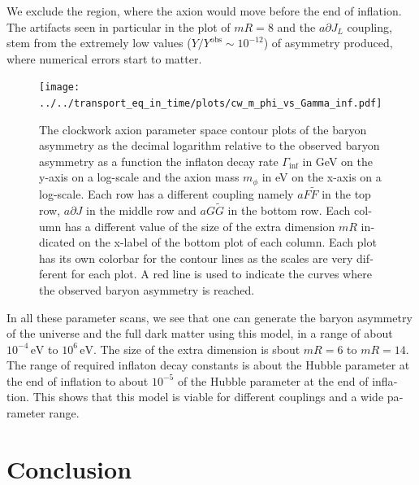 \documentclass[master,       %
               twoside,        %
               BCOR10mm,       %
               english,ngerman, %
               ]{GAUBM}
\begin{document}
\begin{otherlanguage}{english}
We exclude the region, where the axion would move before the end of inflation.
The artifacts seen in particular in the plot of $mR = 8$ and the $a \partial J_L$ coupling, stem from the extremely low values ($Y / Y^\mathrm{obs} \sim 10^{-12}$) of asymmetry produced, where numerical errors start to matter.
\begin{figure}[H]
    \texttt{[image: ../../transport\_eq\_in\_time/plots/cw\_m\_phi\_vs\_Gamma\_inf.pdf]}
    \caption{The clockwork axion parameter space contour plots of the baryon asymmetry as the decimal logarithm relative to the observed baryon asymmetry as a function the inflaton decay rate $\Gamma_\mathrm{inf}$ in GeV on the y-axis on a log-scale and the axion mass $m_\phi$ in eV on the x-axis on a log-scale.
    Each row has a different coupling namely $a F \tilde{F}$ in the top row, $a \partial J$ in the middle row and $a G \tilde{G}$ in the bottom row. Each column has a different value of the size of the extra dimension $mR$ indicated on the x-label of the bottom plot of each column. Each plot has its own colorbar for the contour lines as the scales are very different for each plot. A red line is used to indicate the curves where the observed baryon asymmetry is reached.}
	\label{fig:cw_m_phi_vs_Gamma_inf}
\end{figure}
In all these parameter scans, we see that one can generate the baryon asymmetry of the universe and the full dark matter using this model, in a range of about $10^{-4} \, \mathrm{eV}$ to $10^{6} \, \mathrm{eV}$. The size of the extra dimension is sbout $mR = 6$ to $mR = 14$. The range of required inflaton decay constants is about the Hubble parameter at the end of inflation to about $10^{-5}$ of the Hubble parameter at the end of inflation.
This shows that this model is viable for different couplings and a wide parameter range.


\chapter{Conclusion}


\end{otherlanguage}
\end{document}
